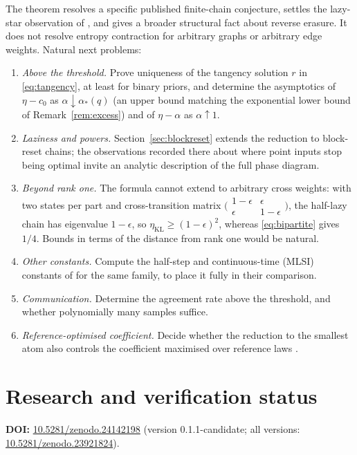\documentclass[11pt,a4paper]{article}
\numberwithin{equation}{section}
\theoremstyle{definition}
\theoremstyle{remark}
\newcommand{\etaKL}{\eta_{\mathrm{KL}}}
\newcommand{\ac}{\alpha_*}
\begin{document}
The theorem resolves a specific published finite-chain conjecture, settles
the lazy-star observation of \cite{jadhav}, and gives a broader structural
fact about reverse erasure. It does not resolve entropy contraction for
arbitrary graphs or arbitrary edge weights. Natural next problems:
\begin{enumerate}[label=(\arabic*)]
\item \emph{Above the threshold.} Prove uniqueness of the tangency solution
\(r\) in \eqref{eq:tangency}, at least for binary priors, and determine the
asymptotics of \(\eta-c_0\) as \(\alpha\downarrow\ac(q)\) (an upper bound
matching the exponential lower bound of Remark~\ref{rem:excess}) and of
\(\eta-\alpha\) as \(\alpha\uparrow1\).
\item \emph{Laziness and powers.} Section~\ref{sec:blockreset} extends the
reduction to block-reset chains; the observations recorded there about
where point inputs stop being optimal invite an analytic description of the
full phase diagram.
\item \emph{Beyond rank one.} The formula cannot extend to arbitrary cross
weights: with two states per part and cross-transition matrix
\(\bigl(\begin{smallmatrix}1-\epsilon&\epsilon\\\epsilon&1-\epsilon\end{smallmatrix}\bigr)\),
the half-lazy chain has eigenvalue \(1-\epsilon\), so
\(\etaKL\ge(1-\epsilon)^2\), whereas \eqref{eq:bipartite} gives \(1/4\).
Bounds in terms of the distance from rank one would be natural.
\item \emph{Other constants.} Compute the half-step and continuous-time
(MLSI) constants of \cite{caputo} for the same family, to place it fully in
their comparison.
\item \emph{Communication.} Determine the agreement rate above the
threshold, and whether polynomially many samples suffice.
\item \emph{Reference-optimised coefficient.} Decide whether the reduction to
the smallest atom also controls the coefficient maximised over reference
laws \cite{ordentlich}.
\end{enumerate}

\section{Research and verification status}\label{sec:status}

\textbf{DOI:} \href{https://doi.org/10.5281/zenodo.24142198}{10.5281/zenodo.24142198} (version 0.1.1-candidate; all versions:
\href{https://doi.org/10.5281/zenodo.23921824}{10.5281/zenodo.23921824}).
\end{document}
